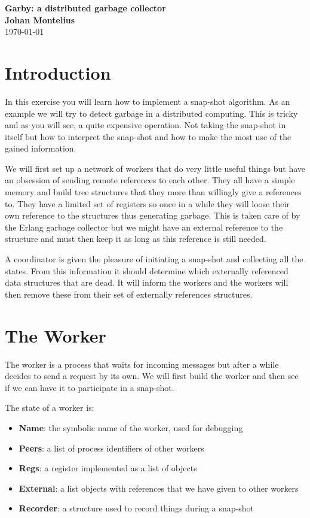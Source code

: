 \documentclass[a4paper,11pt]{article}
\newcommand{\nnsection}[1]{
\section*{#1}
\addcontentsline{toc}{section}{#1}
}
\begin{document}
\begin{center}
\vspace{20pt}
\textbf{\large Garby: a distributed garbage collector}\\
\vspace{10pt}
\textbf{Johan Montelius}\\
\vspace{10pt}
\today{}
\end{center}

\nnsection
{Introduction}

In this exercise you will learn how to implement a snap-shot
algorithm. As an example we will try to detect garbage in a
distributed computing. This is tricky and as you will see, a quite
expensive operation. Not taking the snap-shot in itself but how to
interpret the snap-shot and how to make the most use of the gained
information.

We will first set up a network of workers that do very little useful
things but have an obsession of sending remote references to each
other.  They all have a simple memory and build tree structures that
they more than willingly give a references to. They have a limited set
of registers so once in a while they will loose their own reference to
the structures thus generating garbage. This is taken care of by the
Erlang garbage collector but we might have an external reference to
the structure and must then keep it as long as this reference is still
needed.

A coordinator is given the pleasure of initiating a snap-shot and
collecting all the states. From this information it should determine
which externally referenced data structures that are dead. It will
inform the workers and the workers will then remove these from their
set of externally references structures.


\section{The Worker}

The worker is a process that waits for incoming messages but after a
while decides to send a request by its own. We will first build the
worker and then see if we can have it to participate in a snap-shot.


The state of a worker is:
\begin{itemize}
\item {\bf Name}: the symbolic name of the worker, used for debugging
\item {\bf Peers}: a list of process identifiers of other workers
\item {\bf Regs}: a register implemented as a list of objects
\item {\bf External}: a list objects with references that we have given to other workers
\item {\bf Recorder}: a structure used to record things during a snap-shot
\end{itemize}
\end{document}
